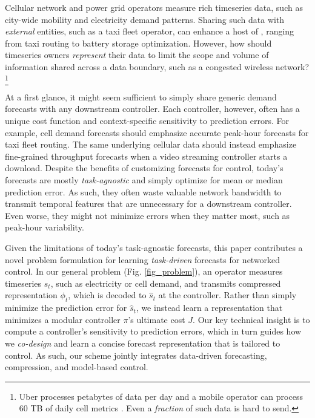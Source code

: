 Cellular network and power grid operators measure rich timeseries data, such as city-wide mobility and electricity demand patterns. Sharing such data with \textit{external} entities, such as a
taxi fleet operator, can enhance a host of , ranging from
taxi routing to battery storage optimization. 
However, how should timeseries owners \textit{represent} their data to limit the scope and volume of information shared across a data boundary, such as a congested wireless network?\footnote{Uber processes petabytes of data per day \cite{Uber} and a mobile operator can process 60 TB of daily cell metrics \cite{SK}. Even a \textit{fraction} of such data is hard to send.}

At a first glance, it might seem sufficient to simply share generic demand forecasts with any downstream controller.
Each controller, however, often has a unique cost function and context-specific sensitivity to prediction errors.
For example, cell demand forecasts should emphasize accurate peak-hour forecasts for taxi fleet routing. The same underlying cellular data should instead emphasize fine-grained throughput forecasts when a video streaming controller starts a download. 
Despite the benefits of customizing forecasts for control, today's forecasts are mostly \textit{task-agnostic} and simply optimize for mean or median prediction error. As such, they often waste valuable network bandwidth to transmit temporal features that are unnecessary for a downstream controller. Even worse, they might not minimize errors when they matter most, such as peak-hour variability.



Given the limitations of today's task-agnostic forecasts, this paper contributes a novel problem formulation for learning \textit{task-driven} forecasts for networked control. 
In our general problem (Fig. \ref{fig_problem}), an operator measures timeseries $s_t$, such as electricity or cell demand, and 
transmits compressed representation $\phi_t$, which is decoded to $\hat{s}_t$ at the controller. Rather than simply minimize the prediction error for $\hat{s}_t$, we instead learn a representation that minimizes a modular controller $\pi$'s ultimate cost $J$.
Our key technical insight is to compute a controller's sensitivity to prediction errors, which in turn guides how we \textit{co-design} and learn a concise forecast representation that is tailored to control. 
As such, our scheme jointly integrates data-driven forecasting, compression, and model-based control. 

